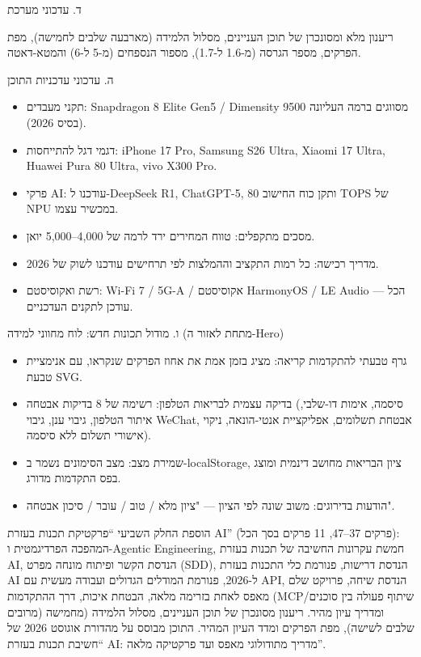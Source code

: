 ד. עדכוני מערכת

ריענון מלא ומסונכרן של תוכן העניינים, מסלול הלמידה (מארבעה שלבים לחמישה), מפת הפרקים, מספר הגרסה (מ-1.6 ל-1.7), מספור הנספחים (מ-5 ל-6) והמטא-דאטה.

ה. עדכוני עדכניות התוכן

\begin{itemize}
  \item תקני מעבדים: Snapdragon 8 Elite Gen5 / Dimensity 9500 מסווגים ברמה העליונה (בסיס 2026).
  \item דגמי דגל להתייחסות: iPhone 17 Pro, Samsung S26 Ultra, Xiaomi 17 Ultra, Huawei Pura 80 Ultra, vivo X300 Pro.
  \item פרקי AI: עודכנו ל-DeepSeek R1, ChatGPT-5, ותקן כוח החישוב 80 TOPS של NPU במכשיר עצמו.
  \item מסכים מתקפלים: טווח המחירים ירד לרמה של 4,000–5,000 יואן.
  \item מדריך רכישה: כל רמות התקציב וההמלצות לפי תרחישים עודכנו לשוק של 2026.
  \item רשת ואקוסיסטם: Wi-Fi 7 / 5G-A / אקוסיסטם HarmonyOS / LE Audio — הכל עודכן לתקנים העדכניים.
\end{itemize}

ו. מודול תכונות חדש: לוח מחווני למידה (מתחת לאזור ה-Hero)

\begin{itemize}
  \item גרף טבעתי להתקדמות קריאה: מציג בזמן אמת את אחוז הפרקים שנקראו, עם אנימציית טבעת SVG.
  \item בדיקה עצמית לבריאות הטלפון: רשימה של 8 בדיקות אבטחה (סיסמה, אימות דו-שלבי, איתור הטלפון, גיבוי ענן, גיבוי WeChat, אבטחת תשלומים, אפליקציית אנטי-הונאה, ניקוי אישורי תשלום ללא סיסמה).
  \item שמירת מצב: מצב הסימונים נשמר ב-localStorage, ציון הבריאות מחושב דינמית ומוצג בפס התקדמות מדורג.
  \item הודעות בדירוגים: משוב שונה לפי הציון — "ציון מלא / טוב / עובר / סיכון אבטחה".
\end{itemize}


הוספת החלק השביעי “פרקטיקת תכנות בעזרת AI” (פרקים 37–47, 11 פרקים בסך הכל): המהפכה הפרדיגמטית ו-Agentic Engineering, חמשת עקרונות החשיבה של תכנות בעזרת AI, הנדסת הקשר ופיתוח מונחה מפרט (SDD), הנדסת דרישות, פנורמת כלי התכנות בעזרת AI ל-2026, פנורמת המודלים הגדולים ועבודה מעשית עם API, הנדסת שיחה, פרויקט שלם מאפס לאחת בזרימה מלאה, הבטחת איכות, דרך ההתקדמות (MCP/שיתוף פעולה בין סוכנים מרובים) ומדריך עיון מהיר. ריענון מסונכרן של תוכן העניינים, מסלול הלמידה (מחמישה שלבים לשישה), מפת הפרקים ומדד העיון המהיר. התוכן מבוסס על מהדורת אוגוסט 2026 של “חשיבת תכנות בעזרת AI: מדריך מתודולוגי מאפס ועד פרקטיקה מלאה”.

